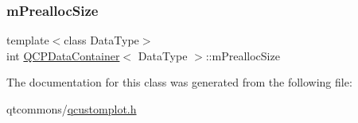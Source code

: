 \subsubsection{\texorpdfstring{mPreallocSize}{mPreallocSize}}
{\footnotesize\ttfamily template$<$class Data\+Type$>$ \\
int \mbox{\hyperlink{class_q_c_p_data_container}{Q\+C\+P\+Data\+Container}}$<$ Data\+Type $>$\+::m\+Prealloc\+Size\hspace{0.3cm}{\ttfamily [protected]}}



The documentation for this class was generated from the following file\+:\begin{DoxyCompactItemize}
\item 
qtcommons/\mbox{\hyperlink{qcustomplot_8h}{qcustomplot.\+h}}\end{DoxyCompactItemize}
